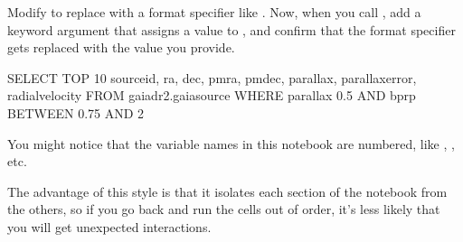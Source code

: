 \documentclass[letterpaper,10pt,english]{sphinxmanual}
\begin{document}
Modify  to replace  with a format specifier like .  Now, when you call , add a keyword argument that assigns a value to , and confirm that the format specifier gets replaced with the value you provide.

\begin{sphinxVerbatim}[commandchars=\\\{\}]

  
\end{sphinxVerbatim}

\begin{sphinxVerbatim}[commandchars=\\\{\}]

  
\end{sphinxVerbatim}

\begin{sphinxVerbatim}[commandchars=\\\{\}]
SELECT TOP 10
source\PYGZus{}id, ra, dec, pmra, pmdec, parallax, parallax\PYGZus{}error, radial\PYGZus{}velocity
FROM gaiadr2.gaia\PYGZus{}source
WHERE parallax \PYGZlt{} 0.5 AND 
bp\PYGZus{}rp BETWEEN \PYGZhy{}0.75 AND 2
\end{sphinxVerbatim}

  You might notice that the variable names in this notebook are numbered, like , , etc.

The advantage of this style is that it isolates each section of the notebook from the others, so if you go back and run the cells out of order, it’s less likely that you will get unexpected interactions.
\end{document}
